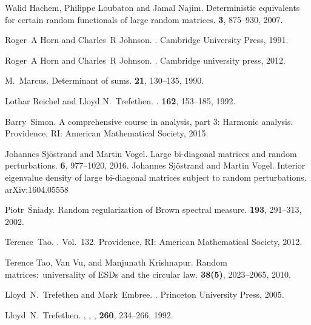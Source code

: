 \documentclass{amsart}
\numberwithin{equation}{section}
\begin{document}
\begin{thebibliography}{99}
 Walid Hachem, Philippe Loubaton and Jamal Najim.
\newblock Deterministic equivalents for certain random functionals of large
random matrices.
 {\bf 3}, 875--930, 2007.

Roger~A Horn and Charles~R Johnson.
.
\newblock Cambridge University Press, 1991.

  Roger~A Horn and Charles~R Johnson.
  .
  \newblock  Cambridge university press, 2012.
  
  M.~Marcus. 
  \newblock Determinant of sums. 
   {\bf 21}, 130--135, 1990.


 Lothar Reichel and Lloyd N.~Trefethen.
  .
   {\bf 162}, 153--185, 1992.

  Barry~Simon.
  \newblock A comprehensive course in analysis, part 3: Harmonic analysis.
  \newblock Providence, RI: American Mathematical Society, 2015.

  Johannes Sj\"{o}strand and Martin Vogel.
  \newblock Large bi-diagonal matrices and random perturbations.
   {\bf 6}, 977--1020, 2016.
  Johannes Sj\"{o}strand and Martin Vogel.
  \newblock Interior eigenvalue density of
  large bi-diagonal matrices subject to random perturbations.
  \newblock arXiv:1604.05558


Piotr~\'{S}niady.
\newblock Random regularization of Brown spectral measure.
 {\bf 193}, 291--313, 2002.

Terence~Tao.
. Vol.~132. Providence, RI: American Mathematical Society,  2012.

Terence Tao, Van Vu, and Manjunath Krishnapur.
\newblock Random matrices:~universality of ESDs and the circular law.
 {\bf 38(5)}, 2023--2065, 2010.

Lloyd~N.~Trefethen and Mark~Embree.
.
\newblock Princeton University Press, 2005.

 Lloyd~N.~Trefethen.
  ,
  ,
  ,
   {\bf 260}, 234--266, 1992.


\end{thebibliography}
\end{document}

